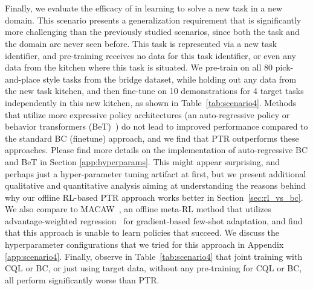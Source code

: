 ~


~

\noindent Finally, we evaluate the efficacy of \ptrmethodname in learning to solve a new task in a new domain. 
This scenario presents a generalization requirement that is significantly more challenging than the previously studied scenarios, since both the task and the domain are never seen before. This task is represented via a new task identifier, and pre-training receives no data for this task identifier, or even any data from the kitchen where this task is situated. We pre-train on all 80 pick-and-place style tasks from the bridge dataset, while holding out any data from the new task kitchen, and then fine-tune on 10 demonstrations for 4 target tasks independently in this new kitchen, as shown in Table~\ref{tab:scenario4}. 
Methods that utilize more expressive policy architectures (an auto-regressive policy or behavior transformers (BeT)~\citep{shafiullah2022behavior}) do not lead to improved performance compared to the standard BC (finetune) approach, and we find that PTR outperforms these approaches. Please find more details on the implementation of auto-regressive BC and BeT in Section \ref{app:hyperparams}. This might appear surprising, and perhaps just a hyper-parameter tuning artifact at first, but we present additional qualitative and quantitative analysis aiming at understanding the reasons behind why our offline RL-based PTR approach works better in Section~\ref{sec:rl_vs_bc}. We also compare to MACAW~\citep{mitchell2021offline}, an offline meta-RL method that utilizes advantage-weighted regression~\citep{peng2019awr} for gradient-based few-shot adaptation, and find that this approach is unable to learn policies that succeed. We discuss the hyperparameter configurations that we tried for this approach in Appendix \ref{app:scenario4}. Finally, observe in Table~\ref{tab:scenario4} that joint training with CQL or BC, or just using target data, without any pre-training for CQL or BC, all perform significantly worse than PTR.

